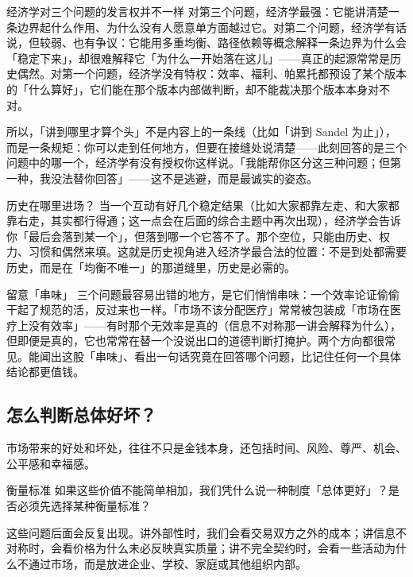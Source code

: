 \documentclass[10pt,a4paper]{ctexart}
\begin{document}
\begin{insightbox}{经济学对三个问题的发言权并不一样}
对第三个问题，经济学最强：它能讲清楚一条边界起什么作用、为什么没有人愿意单方面越过它。对第二个问题，经济学有话说，但较弱、也有争议：它能用多重均衡、路径依赖等概念解释一条边界为什么会「稳定下来」，却很难解释它「为什么一开始落在这儿」——真正的起源常常是历史偶然。对第一个问题，经济学没有特权：效率、福利、帕累托都预设了某个版本的「什么算好」，它们能在那个版本内部做判断，却不能裁决那个版本本身对不对。

所以，「讲到哪里才算个头」不是内容上的一条线（比如「讲到 Sandel 为止」），而是一条规矩：你可以走到任何地方，但要在接缝处说清楚——此刻回答的是三个问题中的哪一个，经济学有没有授权你这样说。「我能帮你区分这三种问题；但第一种，我没法替你回答」——这不是逃避，而是最诚实的姿态。
\end{insightbox}

\begin{conceptbox}{历史在哪里进场？}
当一个互动有好几个稳定结果（比如大家都靠左走、和大家都靠右走，其实都行得通；这一点会在后面的综合主题中再次出现），经济学会告诉你「最后会落到某一个」，但落到哪一个它答不了。那个空位，只能由历史、权力、习惯和偶然来填。这就是历史视角进入经济学最合法的位置：不是到处都需要历史，而是在「均衡不唯一」的那道缝里，历史是必需的。
\end{conceptbox}

\begin{insightbox}{留意「串味」}
三个问题最容易出错的地方，是它们悄悄串味：一个效率论证偷偷干起了规范的活，反过来也一样。「市场不该分配医疗」常常被包装成「市场在医疗上没有效率」——有时那个无效率是真的（信息不对称那一讲会解释为什么），但即便是真的，它也常常在替一个没说出口的道德判断打掩护。两个方向都很常见。能闻出这股「串味」、看出一句话究竟在回答哪个问题，比记住任何一个具体结论都更值钱。
\end{insightbox}

\subsection{怎么判断总体好坏？}

市场带来的好处和坏处，往往不只是金钱本身，还包括时间、风险、尊严、机会、公平感和幸福感。

\begin{discussionbox}{衡量标准}
如果这些价值不能简单相加，我们凭什么说一种制度「总体更好」？是否必须先选择某种衡量标准？
\end{discussionbox}

这些问题后面会反复出现。讲外部性时，我们会看交易双方之外的成本；讲信息不对称时，会看价格为什么未必反映真实质量；讲不完全契约时，会看一些活动为什么不通过市场，而是放进企业、学校、家庭或其他组织内部。
\end{document}
